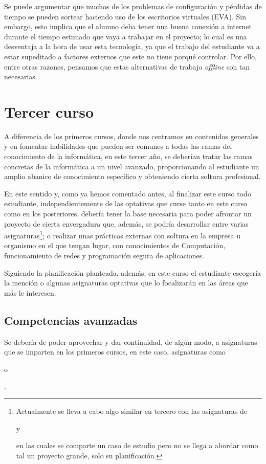 Se puede argumentar que muchos de los problemas de configuración y pérdidas de tiempo se pueden sortear
haciendo uso de los escritorios virtuales (EVA). Sin embargo, esto implica que el alumno deba 
tener una buena conexión a internet durante el tiempo estimado que vaya a trabajar en el proyecto; 
lo cual es una desventaja a la hora de usar esta tecnología, ya que el trabajo del estudiante 
va a estar supeditado a factores externos que este no tiene porqué controlar. Por ello, entre 
otras razones, pensamos que estas alternativas de trabajo \textit{offline} son tan necesarias.


\section{Tercer curso}
A diferencia de los primeros cursos, donde nos centramos en contenidos generales 
y en fomentar habilidades que pueden ser comunes a todas las ramas del conocimiento de 
la informática, en este tercer año, se deberían tratar las ramas concretas de la 
informática a un nivel avanzado, proporcionando al estudiante un amplio abanico de 
conocimiento específico y obteniendo cierta soltura profesional.

En este sentido y, como ya hemos comentado antes, al finalizar este curso todo estudiante, 
independientemente de las optativas que curse tanto en este curso como en los posteriores, 
debería tener la base necesaria para poder afrontar un proyecto de cierta envergadura que, 
además, se podría desarrollar entre varias asignaturas\footnote{Actualmente se lleva a cabo
algo similar en tercero con las asignaturas de \subject{Procesos de Desarrollo Software} y 
\subject{Gestión de Procesos de Desarrollo Software} en las cuales se comparte un caso de 
estudio pero no se llega a abordar como tal un proyecto grande, solo su planificación.}; 
o realizar unas prácticas externas con soltura en la empresa u organismo en el que tengan 
lugar, con conocimientos de Computación, funcionamiento de redes y programación segura de 
aplicaciones.

Siguiendo la planificación planteada, además, en este curso el estudiante escogería la mención 
o algunas asignaturas optativas que lo focalizarán en las áreas que más le interesen.

\subsection{Competencias avanzadas}
Se debería de poder aprovechar y dar continuidad, de algún modo, a asignaturas que se 
imparten en los primeros cursos, en este caso, asignaturas como \subject{Estadística} o 
\subject{Bases de Datos}.

